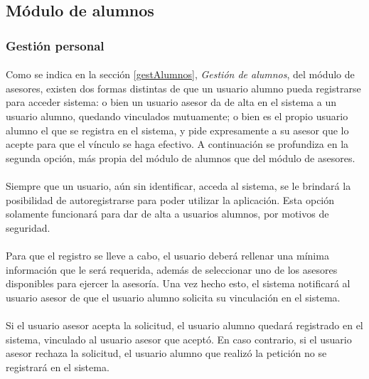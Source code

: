    \subsection{Módulo de alumnos}\label{modAlumnos}

      \subsubsection{Gestión personal}

      \paragraph{}Como se indica en la sección \ref{gestAlumnos},
      \textit{Gestión de alumnos}, del módulo de asesores, existen dos formas
      distintas de que un usuario alumno pueda registrarse para acceder sistema:
      o bien un usuario asesor da de alta en el sistema a un usuario alumno,
      quedando vinculados mutuamente; o bien es el propio usuario alumno el que
      se registra en el sistema, y pide expresamente a su asesor que lo acepte
      para que el vínculo se haga efectivo. A continuación se profundiza en
      la segunda opción, más propia del módulo de alumnos que del módulo de
      asesores.

      \paragraph{}Siempre que un usuario, aún sin identificar, acceda al
      sistema, se le brindará la posibilidad de autoregistrarse para poder
      utilizar la aplicación. Esta opción solamente funcionará para dar de alta
      a usuarios alumnos, por motivos de seguridad.

      \paragraph{}Para que el registro se lleve a cabo, el usuario deberá
      rellenar una mínima información que le será requerida, además de
      seleccionar uno de los asesores disponibles para ejercer la asesoría. Una
      vez hecho esto, el sistema notificará al usuario asesor de que el usuario
      alumno solicita su vinculación en el sistema.

      \paragraph{}Si el usuario asesor acepta la solicitud, el usuario alumno
      quedará registrado en el sistema, vinculado al usuario asesor que aceptó.
      En caso contrario, si el usuario asesor rechaza la solicitud, el usuario
      alumno que realizó la petición no se registrará en el sistema.

